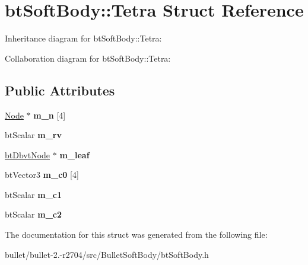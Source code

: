 \hypertarget{structbt_soft_body_1_1_tetra}{\section{bt\+Soft\+Body\+:\+:Tetra Struct Reference}
\label{structbt_soft_body_1_1_tetra}
}


Inheritance diagram for bt\+Soft\+Body\+:\+:Tetra\+:


Collaboration diagram for bt\+Soft\+Body\+:\+:Tetra\+:
\subsection*{Public Attributes}
\begin{DoxyCompactItemize}
\item 
\hypertarget{structbt_soft_body_1_1_tetra_aff3ff48a28a068a8dd469a5da4dbf8f8}{\hyperlink{structbt_soft_body_1_1_node}{Node} $\ast$ {\bfseries m\+\_\+n} \mbox{[}4\mbox{]}}\label{structbt_soft_body_1_1_tetra_aff3ff48a28a068a8dd469a5da4dbf8f8}

\item 
\hypertarget{structbt_soft_body_1_1_tetra_a5e86059848aa6610b4013ba4b4ab0b0e}{bt\+Scalar {\bfseries m\+\_\+rv}}\label{structbt_soft_body_1_1_tetra_a5e86059848aa6610b4013ba4b4ab0b0e}

\item 
\hypertarget{structbt_soft_body_1_1_tetra_acbc2265499f6f0308050178c5ead8a44}{\hyperlink{structbt_dbvt_node}{bt\+Dbvt\+Node} $\ast$ {\bfseries m\+\_\+leaf}}\label{structbt_soft_body_1_1_tetra_acbc2265499f6f0308050178c5ead8a44}

\item 
\hypertarget{structbt_soft_body_1_1_tetra_a86961488ba36f4d17359dd2eddfd04cd}{bt\+Vector3 {\bfseries m\+\_\+c0} \mbox{[}4\mbox{]}}\label{structbt_soft_body_1_1_tetra_a86961488ba36f4d17359dd2eddfd04cd}

\item 
\hypertarget{structbt_soft_body_1_1_tetra_a07bcbc0ba6dadb35227f43998e08efdf}{bt\+Scalar {\bfseries m\+\_\+c1}}\label{structbt_soft_body_1_1_tetra_a07bcbc0ba6dadb35227f43998e08efdf}

\item 
\hypertarget{structbt_soft_body_1_1_tetra_ac0417913135b5a98dc6733e35967e5df}{bt\+Scalar {\bfseries m\+\_\+c2}}\label{structbt_soft_body_1_1_tetra_ac0417913135b5a98dc6733e35967e5df}

\end{DoxyCompactItemize}


The documentation for this struct was generated from the following file\+:\begin{DoxyCompactItemize}
\item 
bullet/bullet-\/2.-\/r2704/src/\+Bullet\+Soft\+Body/bt\+Soft\+Body.\+h\end{DoxyCompactItemize}

